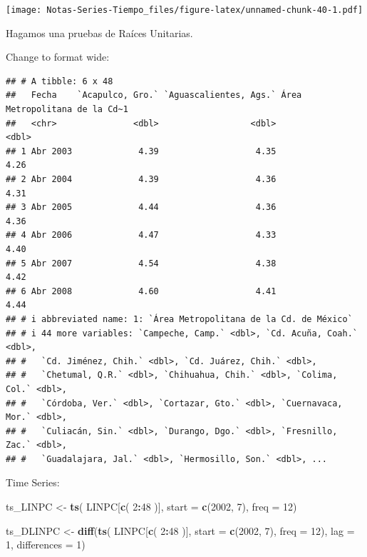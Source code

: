 \documentclass[
]{book}
\newenvironment{Shaded}{\begin{snugshade}}{\end{snugshade}}
\newcommand{\AttributeTok}[1]{\textcolor[rgb]{0.13,0.29,0.53}{#1}}
\newcommand{\DecValTok}[1]{\textcolor[rgb]{0.00,0.00,0.81}{#1}}
\newcommand{\FunctionTok}[1]{\textcolor[rgb]{0.13,0.29,0.53}{\textbf{#1}}}
\newcommand{\NormalTok}[1]{#1}
\newcommand{\OtherTok}[1]{\textcolor[rgb]{0.56,0.35,0.01}{#1}}
\newcommand{\SpecialCharTok}[1]{\textcolor[rgb]{0.81,0.36,0.00}{\textbf{#1}}}
\begin{document}
\texttt{[image: Notas-Series-Tiempo\_files/figure-latex/unnamed-chunk-40-1.pdf]}

Hagamos una pruebas de Raíces Unitarias.

Change to format wide:

\begin{verbatim}
## # A tibble: 6 x 48
##   Fecha    `Acapulco, Gro.` `Aguascalientes, Ags.` Área Metropolitana de la Cd~1
##   <chr>               <dbl>                  <dbl>                         <dbl>
## 1 Abr 2003             4.39                   4.35                          4.26
## 2 Abr 2004             4.39                   4.36                          4.31
## 3 Abr 2005             4.44                   4.36                          4.36
## 4 Abr 2006             4.47                   4.33                          4.40
## 5 Abr 2007             4.54                   4.38                          4.42
## 6 Abr 2008             4.60                   4.41                          4.44
## # i abbreviated name: 1: `Área Metropolitana de la Cd. de México`
## # i 44 more variables: `Campeche, Camp.` <dbl>, `Cd. Acuña, Coah.` <dbl>,
## #   `Cd. Jiménez, Chih.` <dbl>, `Cd. Juárez, Chih.` <dbl>,
## #   `Chetumal, Q.R.` <dbl>, `Chihuahua, Chih.` <dbl>, `Colima, Col.` <dbl>,
## #   `Córdoba, Ver.` <dbl>, `Cortazar, Gto.` <dbl>, `Cuernavaca, Mor.` <dbl>,
## #   `Culiacán, Sin.` <dbl>, `Durango, Dgo.` <dbl>, `Fresnillo, Zac.` <dbl>,
## #   `Guadalajara, Jal.` <dbl>, `Hermosillo, Son.` <dbl>, ...
\end{verbatim}

Time Series:

\begin{Shaded}
\begin{Highlighting}[]
\NormalTok{ts\_LINPC }\OtherTok{\textless{}{-}} \FunctionTok{ts}\NormalTok{( LINPC[}\FunctionTok{c}\NormalTok{( }\DecValTok{2}\SpecialCharTok{:}\DecValTok{48}\NormalTok{ )], }
               \AttributeTok{start =} \FunctionTok{c}\NormalTok{(}\DecValTok{2002}\NormalTok{, }\DecValTok{7}\NormalTok{),}
               \AttributeTok{freq =} \DecValTok{12}\NormalTok{)}

\NormalTok{ts\_DLINPC }\OtherTok{\textless{}{-}} \FunctionTok{diff}\NormalTok{(}\FunctionTok{ts}\NormalTok{( LINPC[}\FunctionTok{c}\NormalTok{( }\DecValTok{2}\SpecialCharTok{:}\DecValTok{48}\NormalTok{ )], }
                     \AttributeTok{start =} \FunctionTok{c}\NormalTok{(}\DecValTok{2002}\NormalTok{, }\DecValTok{7}\NormalTok{),}
                     \AttributeTok{freq =} \DecValTok{12}\NormalTok{), }
                  \AttributeTok{lag =} \DecValTok{1}\NormalTok{, }
                  \AttributeTok{differences =} \DecValTok{1}\NormalTok{)}
\end{Highlighting}
\end{Shaded}
\end{document}
